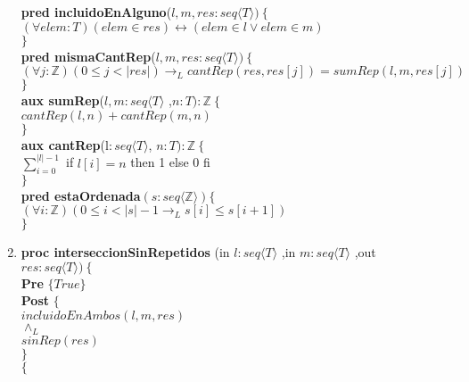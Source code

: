 \documentclass[a4paper]{article}
\begin{document}
\begin{enumerate}[label=\alph*)]
			\textbf{pred incluidoEnAlguno}($l,m,res:seq\langle T\rangle)
			\ \{$\smallskip \\
			\hspace*{6mm}$ (\forall elem:T)(elem\in res) \leftrightarrow (elem\in l \vee 
			elem\in m)$\\
			$\}$\smallskip \\	
			
			\textbf{pred mismaCantRep}($l,m,res:seq\langle T\rangle)
			\ \{$\smallskip \\
			\hspace*{6mm}$(\forall j:\mathbb{Z})(0\leq j<|res|)\rightarrow_L
			cantRep(res,res[j])=sumRep(l,m,res[j])$\\
			$\}$\smallskip \\	
			
			\textbf{aux sumRep}($l,m:seq\langle T\rangle$
				,$n:T ):\mathbb{Z}\ \{$\smallskip \\
			\hspace*{6mm} $cantRep(l,n)+cantRep(m,n)$\\
			$\}$\smallskip \\			
			
			\textbf{aux cantRep}(l$: seq\langle T\rangle$, $n:T):\mathbb{Z}
			\ \{$\smallskip \\
			\hspace*{6mm}$\sum_{i=0}^{|l|-1}$ if $l[i]=n$ then 1 else 0 fi\\
			$\}$\smallskip \\
			
			\textbf{pred estaOrdenada}$(s: seq\langle \mathbb{Z} \rangle)\{$\\
			\hspace*{6mm}$(\forall i:\mathbb{Z})
				(0\leq i<\vert s\vert -1\rightarrow_L s[i]\leq s[i+1])$\\
			$\}$\smallskip \\
			
		\item
			
			\textbf{proc interseccionSinRepetidos }(in $l:seq\langle T\rangle$
				,in $m:seq\langle T\rangle$
				,out $res:seq\langle T\rangle )\ \{$\smallskip \\
			\hspace*{6mm} \textbf{Pre }$\{ True\}$\smallskip \\
			\hspace*{6mm} \textbf{Post }$\{$\\
			\hspace*{6mm} $incluidoEnAmbos(l,m,res)$\\
			\hspace*{6mm} $\wedge_L$\\
			\hspace*{6mm} $sinRep(res)$\\
			\hspace*{6mm} $\}$\\
			$\{$\smallskip \\
			

\end{enumerate}
\end{document}
